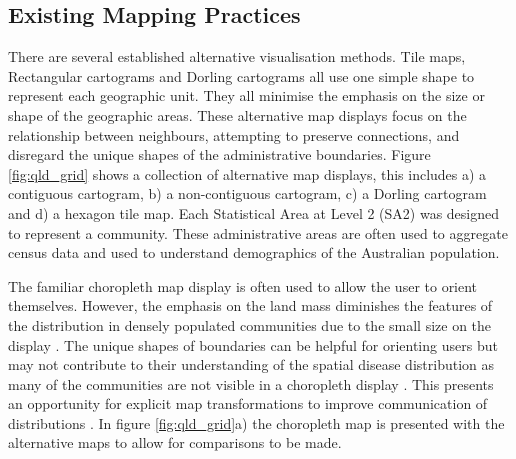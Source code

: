\hypertarget{existing-mapping-practices}{%
\subsection{Existing Mapping
Practices}\label{existing-mapping-practices}}

There are several established alternative visualisation methods. Tile
maps, Rectangular cartograms \citep{ORC} and Dorling cartograms
\citep{ACTUC} all use one simple shape to represent each geographic
unit. They all minimise the emphasis on the size or shape of the
geographic areas. These alternative map displays focus on the
relationship between neighbours, attempting to preserve connections, and
disregard the unique shapes of the administrative boundaries. Figure
\ref{fig:qld_grid} shows a collection of alternative map displays, this
includes a) a contiguous cartogram, b) a non-contiguous cartogram, c) a
Dorling cartogram and d) a hexagon tile map. Each Statistical Area at
Level 2 (SA2) \citep{abs2011} was designed to represent a community.
These administrative areas are often used to aggregate census data and
used to understand demographics of the Australian population.

The familiar choropleth map display is often used to allow the user to
orient themselves. However, the emphasis on the land mass diminishes the
features of the distribution in densely populated communities due to the
small size on the display \citep{ACTUC}. The unique shapes of boundaries
can be helpful for orienting users but may not contribute to their
understanding of the spatial disease distribution as many of the
communities are not visible in a choropleth display \citep{TVSSS}. This
presents an opportunity for explicit map transformations to improve
communication of distributions \citep{CBATCC}. In figure
\ref{fig:qld_grid}a) the choropleth map is presented with the
alternative maps to allow for comparisons to be made.

